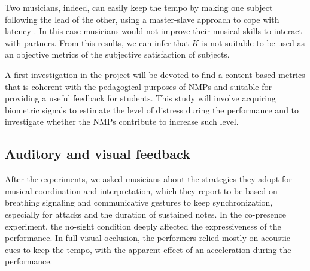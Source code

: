\documentclass[conference]{IEEEtran}
\begin{document}
Two musicians, indeed, can easily keep the tempo by making one subject following the lead of the other, using a master-slave approach to cope with latency \cite{Carot07networkmusic}. In this case musicians would not improve their musical skills to interact with partners. From this results, we can infer that $K$ is not suitable to be used as an objective metrics of the subjective satisfaction of subjects. 

A first investigation in the project will be devoted to find a content-based metrics that is coherent with the pedagogical purposes of NMPs and suitable for providing a 
useful feedback for students.%
This study will involve acquiring %
biometric signals to estimate the level of distress during the performance and to investigate whether the NMPs contribute to increase such level. 

\subsection{Auditory and visual feedback}
After the experiments, we asked musicians about the strategies they adopt for 
musical coordination and interpretation, which they report to be based on breathing signaling and communicative gestures to keep synchronization, especially for attacks and the duration of sustained notes. In the co-presence experiment, %
the no-sight condition deeply affected the expressiveness of the performance. In full visual occlusion, the performers relied mostly on acoustic cues to keep the tempo, with the apparent effect of an acceleration during the performance. 
\end{document}
